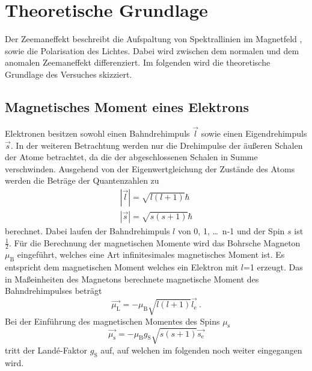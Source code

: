 \section{Theoretische Grundlage}
\label{sec:Theorie}
Der Zeemaneffekt beschreibt die Aufspaltung von Spektrallinien im Magnetfeld , sowie die Polarisation des Lichtes. Dabei wird zwischen dem normalen und dem anomalen Zeemaneffekt differenziert. Im folgenden wird die theoretische Grundlage des Versuches skizziert.

\subsection{Magnetisches Moment eines Elektrons}
Elektronen besitzen sowohl einen Bahndrehimpuls $\vec{l}$ sowie einen Eigendrehimpuls $\vec{s}$. In der weiteren Betrachtung werden nur die Drehimpulse der äußeren Schalen der Atome betrachtet, da die der abgeschlossenen Schalen in Summe verschwinden. Ausgehend von der Eigenwertgleichung der Zustände des Atoms werden die Beträge der Quantenzahlen zu
\begin{eqnarray}
  |\vec{l}| = \sqrt{l(l+1)} \hbar  \\
  |\vec{s}| = \sqrt{s(s+1)} \hbar
  \label{eqn:betQua}
\end{eqnarray}
berechnet. Dabei laufen der Bahndrehimpuls $l$ von 0, 1, \ldots $\,$ n-1 und der Spin $s$ ist $\frac{1}{2}$. Für die Berechnung der magnetischen Momente wird das Bohrsche Magneton $\mu_\text{B}$ eingeführt, welches eine Art infinitesimales magnetisches Moment ist. Es entspricht dem magnetischen Moment welches ein Elektron mit $l$=1 erzeugt. Das in Maßeinheiten des Magnetons berechnete magnetische Moment des Bahndrehimpulses beträgt
\begin{equation}
  \vec{\mu_\text{L}} = -\mu_\text{B} \sqrt{l(l+1)} \vec{l_\text{e}} \ .
  \label{eqn:magL}
\end{equation}
Bei der Einführung des magnetischen Momentes des Spins $\mu_\text{s}$
\begin{equation}
  \vec{\mu_\text{s}} = - \mu_\text{B} g_\text{S} \sqrt{s(s+1)} \vec{s_\text{e}}
  \label{eqn:magS}
\end{equation}
tritt der Landé-Faktor $g_\text{S}$ auf, auf welchen im folgenden noch weiter eingegangen wird.

